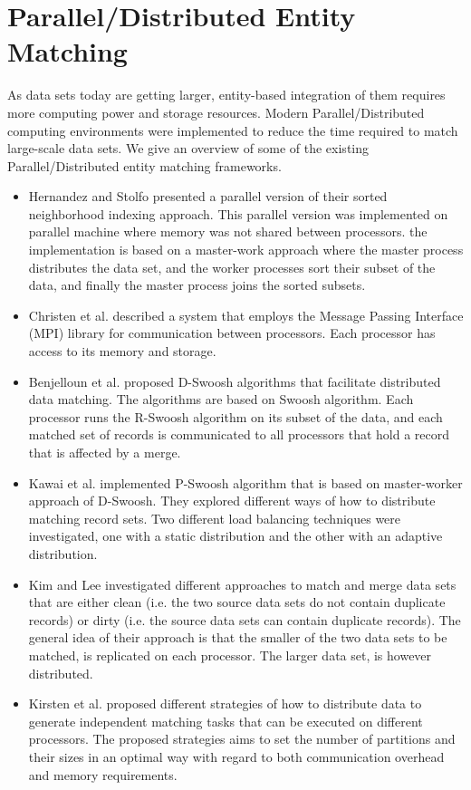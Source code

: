 \section{Parallel/Distributed Entity Matching}
As data sets today are getting larger, entity-based integration of them requires more computing power and storage resources. Modern Parallel/Distributed computing environments were implemented to reduce the time required to match large-scale data sets. We give an overview of some of the existing Parallel/Distributed entity matching frameworks\cite{Chri12}.

\begin{itemize}

\item Hernandez and Stolfo \cite{HeSt95} presented a parallel version of their sorted neighborhood indexing approach. This parallel version was implemented on parallel machine where memory was not shared between processors. the implementation is based on a master-work approach where the master process distributes the data set, and the worker processes sort their subset of the data, and finally the master process joins the sorted subsets.

\item Christen et al.\cite{CCHe04} described a system that employs the Message Passing Interface (MPI) library for communication between processors. Each processor has access to its memory and storage.

\item Benjelloun et al.\cite{BGG*07} proposed D-Swoosh algorithms that facilitate distributed data matching. The algorithms are based on Swoosh algorithm. Each processor runs the R-Swoosh algorithm on its subset of the data, and each matched set of records is communicated to all processors that hold a record that is affected by a merge.

\item Kawai et al. \cite{KGB*06} implemented P-Swoosh algorithm that is based on master-worker approach of D-Swoosh. They explored different ways of how to distribute matching record sets. Two different load balancing techniques were investigated, one with a static distribution and the other with an adaptive distribution.

\item Kim and Lee \cite{KiLe07} investigated different approaches to match and merge data sets that are either clean (i.e. the two source data sets do not contain duplicate records) or dirty (i.e. the source data sets can contain duplicate records). The general idea of their approach is that the smaller of the two data sets to be matched, is replicated on each processor. The larger data set, is however distributed.

\item Kirsten et al.\cite{KKH*10} proposed different strategies of how to distribute data to generate independent matching tasks that can be executed on different processors. The proposed strategies aims to set the number of partitions and their sizes in an optimal way with regard to both communication overhead and memory requirements.

\end{itemize}

